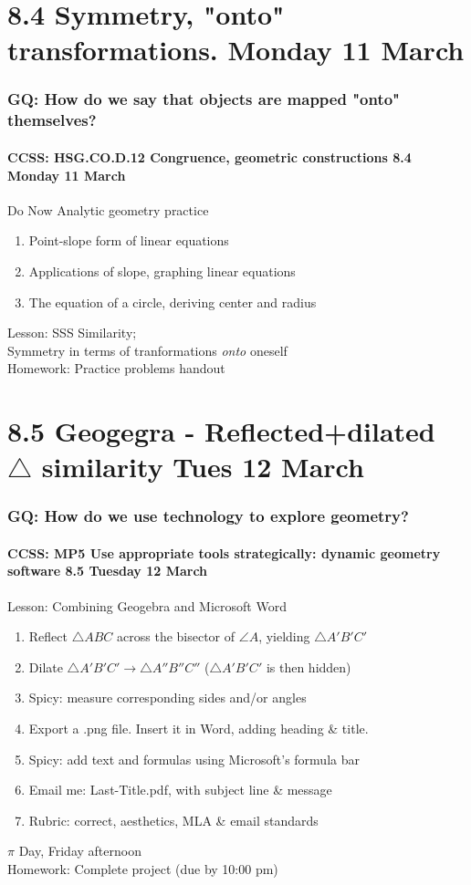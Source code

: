 \documentclass{beamer}
\begin{document}
\section{8.4 Symmetry, "onto" transformations. Monday 11 March}
  \frame
  {
    \frametitle{GQ: How do we say that objects are mapped "onto" themselves?}
    \framesubtitle{CCSS: HSG.CO.D.12 Congruence, geometric constructions \hfill \alert{8.4 Monday 11 March}}

    \begin{block}{Do Now Analytic geometry practice}
      \begin{enumerate}
        \item Point-slope form of linear equations
        \item Applications of slope, graphing linear equations
        \item The equation of a circle, deriving center and radius
      \end{enumerate}
    \end{block}
    Lesson: SSS Similarity;
    \\Symmetry in terms of tranformations \emph{onto} oneself\\[0.5cm]
    Homework: Practice problems handout
  }

\section{8.5 Geogegra - Reflected+dilated $\triangle$ similarity Tues 12 March}
  \frame
  {
    \frametitle{GQ: How do we use technology to explore geometry?}
    \framesubtitle{CCSS: MP5 Use appropriate tools strategically: dynamic geometry software \hfill \alert{8.5 Tuesday 12 March}}

    \begin{block}{Lesson: Combining Geogebra and Microsoft Word}
      \begin{enumerate}
        \item Reflect $\triangle ABC$ across the bisector of $\angle A$, yielding $\triangle A'B'C'$
        \item Dilate $\triangle A'B'C' \rightarrow \triangle A''B''C''$ ($\triangle A'B'C'$ is then hidden)
        \item Spicy: measure corresponding sides and/or angles
        \item Export a .png file. Insert it in Word, adding heading \& title.
        \item Spicy: add text and formulas using Microsoft's formula bar
        \item Email me: Last-Title.pdf, with subject line \& message
        \item Rubric: correct, aesthetics, MLA \& email standards
      \end{enumerate}
    \end{block}
    \alert{$\pi$ Day, Friday afternoon}\\
    Homework: Complete project (due by 10:00 pm)
  }
\end{document}
